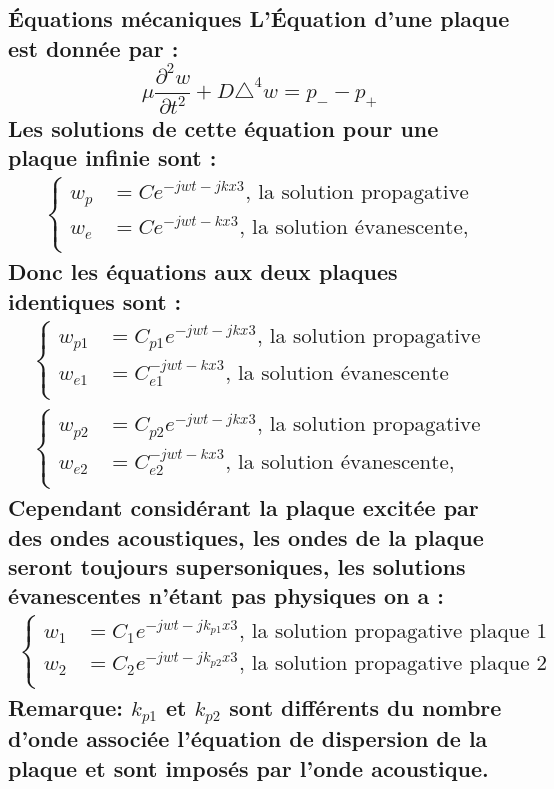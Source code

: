 \documentclass[12pt,foolscap]{report}
\begin{document}
\subsection*{Équations mécaniques
L'Équation d'une plaque est donnée par :
\begin{equation}
\mu \frac{\partial^2w}{\partial t^2}+D\triangle^4w = p_- -p_+
\end{equation}
Les solutions de cette équation pour une plaque infinie sont : 
\begin{align}
\begin{cases}
w_p &= Ce^{-jwt-jkx3} \text{, la solution propagative}\\
w_e &= Ce^{-jwt-kx3}\text{, la solution évanescente,}\\
\end{cases}
\end{align}
Donc les équations aux deux plaques identiques sont : 
\begin{align}
\begin{cases}
w_{p1} &= C_{p1}e^{-jwt-jkx3} \text{, la solution propagative}\\
w_{e1} &= C_{e1}^{-jwt-kx3}\text{, la solution évanescente}\\
\end{cases}\\
\begin{cases}
w_{p2} &= C_{p2}e^{-jwt-jkx3} \text{, la solution propagative}\\
w_{e2} &= C_{e2}^{-jwt-kx3}\text{, la solution évanescente,}\\
\end{cases}
\end{align}
Cependant considérant la plaque excitée par des ondes acoustiques, les ondes de la plaque seront toujours supersoniques, les solutions évanescentes n'étant pas physiques on a :
\begin{align}
\begin{cases}
w_{1} &= C_{1}e^{-jwt-jk_{p1}x3} \text{, la solution propagative plaque 1}\\
w_{2} &= C_{2}e^{-jwt-jk_{p2}x3} \text{, la solution propagative plaque 2}\\
\end{cases}
\end{align}
\textbf{Remarque:} $k_{p1}$ et $k_{p2}$ sont différents du nombre d'onde associée l'équation de dispersion de la plaque et sont imposés par l'onde acoustique.
}
\end{document}
